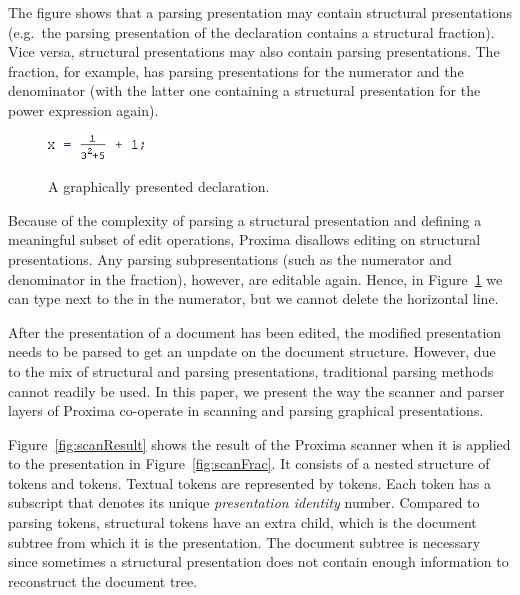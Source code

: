 \documentclass[12pt]{article}
\begin{document}
The figure shows that a parsing presentation may contain structural presentations (e.g.\ the parsing presentation of the declaration contains a structural fraction). Vice versa, structural presentations may also contain parsing presentations. The fraction, for example, has parsing presentations for the numerator and the denominator (with the latter one containing a structural presentation for the power expression again).


\begin{figure}
\begin{center}
\includegraphics[width=1in]{images/scanFrac}\
\end{center}
\caption{A graphically presented declaration.} \label{fig:graphicalDecl} 
\end{figure}




Because of the complexity of parsing a structural presentation and defining a meaningful subset of edit operations, Proxima disallows editing on structural presentations. Any parsing subpresentations (such as the numerator and denominator in the fraction), however, are editable again. Hence, in Figure~\ref{fig:graphicalDecl} we can type  next to the  in the numerator, but we cannot delete the horizontal line.

After the presentation of a document has been edited, the modified presentation needs to be parsed to get an unpdate on the document structure. However, due to the mix of structural and parsing presentations, traditional parsing methods cannot readily be used. In this paper, we present the way the scanner and parser layers of Proxima co-operate in scanning and parsing graphical presentations. 

Figure~\ref{fig:scanResult} shows the result of the Proxima scanner when it is applied to the presentation in Figure~\ref{fig:scanFrac}. It consists of a nested structure of  tokens and  tokens. Textual tokens are represented by  tokens. Each token has a subscript that denotes its unique {\em presentation identity} number. Compared to parsing tokens, structural tokens have an extra child, which is the document subtree from which it is the presentation. The document subtree is necessary since sometimes a structural presentation does not contain enough information to reconstruct the document tree.
\end{document}
